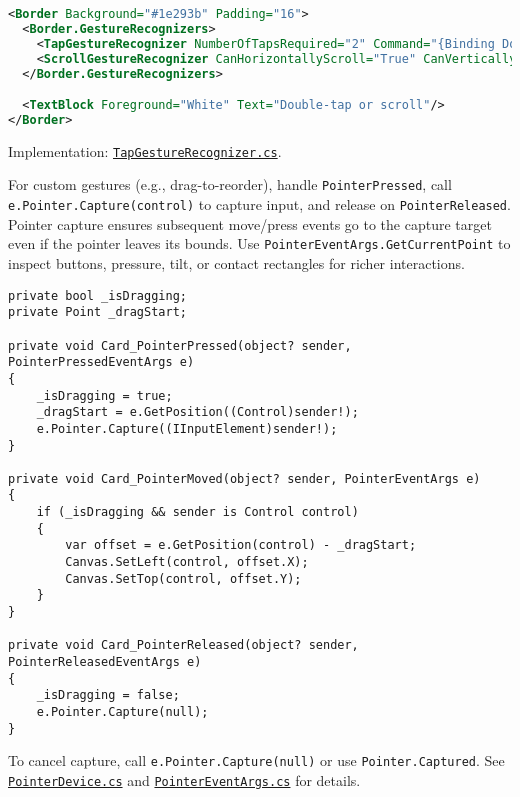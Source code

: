 \begin{lstlisting}[language=XML]
<Border Background="#1e293b" Padding="16">
  <Border.GestureRecognizers>
    <TapGestureRecognizer NumberOfTapsRequired="2" Command="{Binding DoubleTapCommand}" CommandParameter="Canvas"/>
    <ScrollGestureRecognizer CanHorizontallyScroll="True" CanVerticallyScroll="True"/>
  </Border.GestureRecognizers>

  <TextBlock Foreground="White" Text="Double-tap or scroll"/>
</Border>
\end{lstlisting}

Implementation:
\href{https://github.com/AvaloniaUI/Avalonia/blob/master/src/Avalonia.Base/Input/GestureRecognizers/TapGestureRecognizer.cs}{\passthrough{\lstinline!TapGestureRecognizer.cs!}}.

For custom gestures (e.g., drag-to-reorder), handle
\passthrough{\lstinline!PointerPressed!}, call
\passthrough{\lstinline!e.Pointer.Capture(control)!} to capture input,
and release on \passthrough{\lstinline!PointerReleased!}. Pointer
capture ensures subsequent move/press events go to the capture target
even if the pointer leaves its bounds. Use
\passthrough{\lstinline!PointerEventArgs.GetCurrentPoint!} to inspect
buttons, pressure, tilt, or contact rectangles for richer interactions.

\begin{lstlisting}
private bool _isDragging;
private Point _dragStart;

private void Card_PointerPressed(object? sender, PointerPressedEventArgs e)
{
    _isDragging = true;
    _dragStart = e.GetPosition((Control)sender!);
    e.Pointer.Capture((IInputElement)sender!);
}

private void Card_PointerMoved(object? sender, PointerEventArgs e)
{
    if (_isDragging && sender is Control control)
    {
        var offset = e.GetPosition(control) - _dragStart;
        Canvas.SetLeft(control, offset.X);
        Canvas.SetTop(control, offset.Y);
    }
}

private void Card_PointerReleased(object? sender, PointerReleasedEventArgs e)
{
    _isDragging = false;
    e.Pointer.Capture(null);
}
\end{lstlisting}

To cancel capture, call
\passthrough{\lstinline!e.Pointer.Capture(null)!} or use
\passthrough{\lstinline!Pointer.Captured!}. See
\href{https://github.com/AvaloniaUI/Avalonia/blob/master/src/Avalonia.Base/Input/Pointer/PointerDevice.cs}{\passthrough{\lstinline!PointerDevice.cs!}}
and
\href{https://github.com/AvaloniaUI/Avalonia/blob/master/src/Avalonia.Base/Input/PointerEventArgs.cs}{\passthrough{\lstinline!PointerEventArgs.cs!}}
for details.


